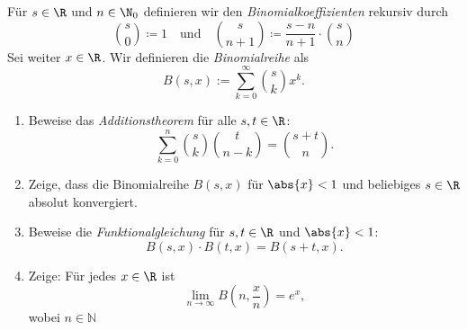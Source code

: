 \begin{prob}
  Für $s \in \R$ und $n \in \N_0$ definieren wir den
  \textit{Binomialkoeffizienten} rekursiv durch
  \begin{equation*}
    \binom{s}{0} \coloneqq 1 \quad \text{und} \quad
    \binom{s}{n + 1} \coloneqq \frac{s - n}{n + 1} \cdot \binom{s}{n}
  \end{equation*}
  Sei weiter $x \in \R$. Wir definieren die \textit{Binomialreihe} als
  \begin{equation*}
    B(s,x):=\sum_{k=0}^\infty \binom{s}{k}x^k.
  \end{equation*}
  \begin{enumerate}[label=(\alph*)]
  \item Beweise das \emph{Additionstheorem} für alle $s, t \in \R$:
    \begin{equation*}
      \sum_{k=0}^n \binom{s}{k}\binom{t}{n - k}
      =
      \binom{s+t}{n}.
    \end{equation*}
  \item Zeige, dass die Binomialreihe $B(s,x)$ für $\abs{x} < 1$ und beliebiges
    $s \in \R$ absolut konvergiert.
  \item Beweise die \textit{Funktionalgleichung} für $s, t \in \R$ und
    $\abs{x} < 1$:
    \begin{equation*}
      B(s, x) \cdot B(t,x) = B(s + t, x).
    \end{equation*}
  \item Zeige: Für jedes $x \in \R$ ist
    \begin{equation*}
      \lim_{n\to\infty} B\left( n, \frac{x}{n} \right) = e^x,
    \end{equation*}
    wobei $n\in\mathbb{N}$
  \end{enumerate}
\end{prob}
